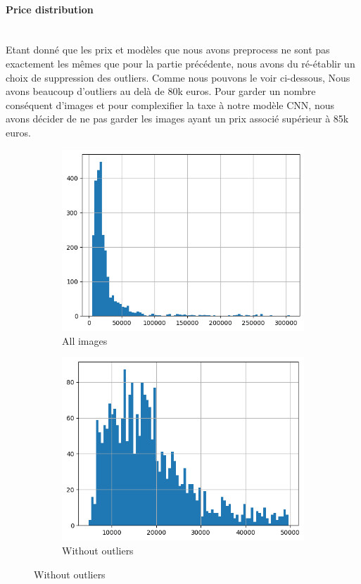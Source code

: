 \documentclass[12pt]{article}
\begin{document}
\paragraph{Price distribution}
~~\\
\noindent Etant donné que les prix et modèles que nous avons preprocess ne sont pas exactement les mêmes que pour la partie précédente, nous avons du ré-établir un choix de suppression des outliers. Comme nous pouvons le voir ci-dessous, Nous avons beaucoup d'outliers au delà de 80k euros. Pour garder un nombre conséquent d'images et pour complexifier la taxe à notre modèle CNN, nous avons décider de ne pas garder les images ayant un prix associé supérieur à 85k euros.

\begin{figure}[ht] 
    \centering

    \begin{subfigure}[b]{0.45\textwidth} 
        \includegraphics[width=\textwidth]{price_image_distribution_1.png}
        \caption{All images}
        \label{fig:image1}
    \end{subfigure}
    \hfill %
    \begin{subfigure}[b]{0.45\textwidth}
        \includegraphics[width=\textwidth]{price_image_distribution_2.png}
        \caption{Without outliers}
        \label{fig:image2}
    \end{subfigure}


\end{figure}
\end{document}

